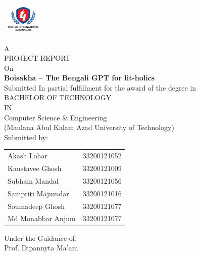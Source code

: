 \documentclass[12pt]{article}
\begin{document}
\begin{titlepage}
    \begin{center}
        \vspace*{0.5cm}
        
        \includegraphics[width=2cm]{university-logo.jpeg}
        
        \vspace{0.5cm}
        {\large A}\\[0.3cm]
        {\large PROJECT REPORT}\\[0.3cm]
        {\large On}\\[0.5cm]
        
        {\LARGE\textbf{Boisakha -- The Bengali GPT for lit-holics}}\\[1cm]
        
        {\large Submitted In partial fulfillment for the award of the degree in}\\[0.7cm]
        
        {\Large BACHELOR OF TECHNOLOGY}\\[0.3cm]
        {\large IN}\\[0.3cm]
        {\large Computer Science \& Engineering}\\[0.3cm]
        
        {\large (Maulana Abul Kalam Azad University of Technology)}\\[1cm]
        
        {\large Submitted by:}\\[0.5cm]
        
        \begin{tabular}{ll}
            Akash Lohar & 33200121052\\
            Kaustavee Ghosh & 33200121009\\
            Subham Mandal & 33200121056\\
            Sampriti Majumdar & 33200121016\\
            Soumadeep Ghosh & 33200121077\\
            Md Monabbar Anjum & 33200121077
        \end{tabular}
        
        \vfill
        
        {\large Under the Guidance of:}\\[0.3cm]
        {\large Prof. Dipannyta Ma'am}
        
    \end{center}
\end{titlepage}
\end{document}
